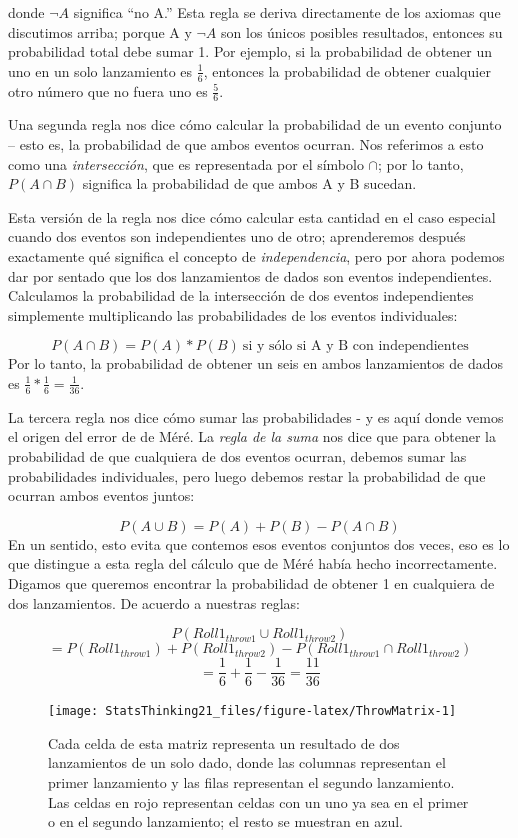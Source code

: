 \documentclass[
  12pt,
]{book}
\theoremstyle{definition}
\theoremstyle{definition}
\theoremstyle{definition}
\theoremstyle{remark}
\begin{document}
donde \(\neg A\) significa ``no A.'' Esta regla se deriva directamente de los axiomas que discutimos arriba; porque A y \(\neg A\) son los únicos posibles resultados, entonces su probabilidad total debe sumar 1. Por ejemplo, si la probabilidad de obtener un uno en un solo lanzamiento es \(\frac{1}{6}\), entonces la probabilidad de obtener cualquier otro número que no fuera uno es \(\frac{5}{6}\).

Una segunda regla nos dice cómo calcular la probabilidad de un evento conjunto -- esto es, la probabilidad de que ambos eventos ocurran. Nos referimos a esto como una \emph{intersección}, que es representada por el símbolo \(\cap\); por lo tanto, \(P(A \cap B)\) significa la probabilidad de que ambos A y B sucedan.

Esta versión de la regla nos dice cómo calcular esta cantidad en el caso especial cuando dos eventos son independientes uno de otro; aprenderemos después exactamente qué significa el concepto de \emph{independencia}, pero por ahora podemos dar por sentado que los dos lanzamientos de dados son eventos independientes. Calculamos la probabilidad de la intersección de dos eventos independientes simplemente multiplicando las probabilidades de los eventos individuales:

\[
P(A \cap B) = P(A) * P(B)\ \text{si y sólo si A y B con independientes}
\]
Por lo tanto, la probabilidad de obtener un seis en ambos lanzamientos de dados es \(\frac{1}{6}*\frac{1}{6}=\frac{1}{36}\).

La tercera regla nos dice cómo sumar las probabilidades - y es aquí donde vemos el origen del error de de Méré. La \emph{regla de la suma} nos dice que para obtener la probabilidad de que cualquiera de dos eventos ocurran, debemos sumar las probabilidades individuales, pero luego debemos restar la probabilidad de que ocurran ambos eventos juntos:

\[
P(A \cup B) = P(A) + P(B) - P(A \cap B)
\]
En un sentido, esto evita que contemos esos eventos conjuntos dos veces, eso es lo que distingue a esta regla del cálculo que de Méré había hecho incorrectamente. Digamos que queremos encontrar la probabilidad de obtener 1 en cualquiera de dos lanzamientos. De acuerdo a nuestras reglas:

\[
P(Roll1_{throw1} \cup Roll1_{throw2}) 
\]
\[
= P(Roll1_{throw1}) + P(Roll1_{throw2}) - P(Roll1_{throw1} \cap Roll1_{throw2}) 
\]
\[
= \frac{1}{6} + \frac{1}{6} - \frac{1}{36} = \frac{11}{36}
\]

\begin{figure}
\texttt{[image: StatsThinking21\_files/figure-latex/ThrowMatrix-1]} \caption{Cada celda de esta matriz representa un resultado de dos lanzamientos de un solo dado, donde las columnas representan el primer lanzamiento y las filas representan el segundo lanzamiento. Las celdas en rojo representan celdas con un uno ya sea en el primer o en el segundo lanzamiento; el resto se muestran en azul. }\label{fig:ThrowMatrix}
\end{figure}
\end{document}

